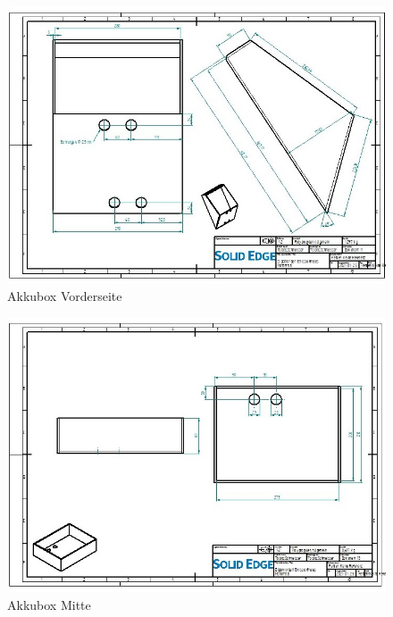 \begin{figure} [H]
	\begin{center}
		\includegraphics[angle=90]{figures/mechanik/Box_2_Zeichnung.jpg}
		\caption{Akkubox Vorderseite}
		\label{fig:Akkubox Vorderseite}
	\end{center}
\end{figure}


\begin{figure} [H]
	\begin{center}
		\includegraphics[angle=90]{figures/mechanik/Box_3_Zeichnung.jpg}
		\caption{Akkubox Mitte}
		\label{fig:Akkubox Mitte}
	\end{center}
\end{figure}

